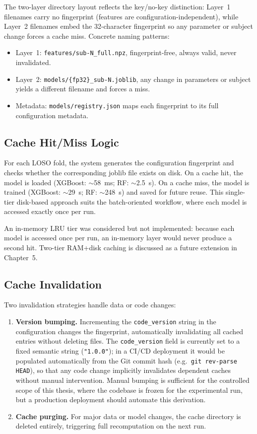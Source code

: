 The two-layer directory layout reflects the key/no-key distinction:
Layer~1 filenames carry no fingerprint (features are
configuration-independent), while Layer~2 filenames embed the
32-character fingerprint so any parameter or subject change forces a
cache miss. Concrete naming patterns:
\begin{itemize}
\item Layer~1: \texttt{features/sub-N\_full.npz}, fingerprint-free,
 always valid, never invalidated.
\item Layer~2: \texttt{models/\{fp32\}\_sub-N.joblib}, any change in
 parameters or subject yields a different filename and forces a
 miss.
\item Metadata: \texttt{models/registry.json} maps each fingerprint to
 its full configuration metadata.
\end{itemize}

\subsection{Cache Hit/Miss Logic}

For each LOSO fold, the system generates the configuration fingerprint and
checks whether the corresponding joblib file exists on disk. On a cache hit,
the model is loaded (XGBoost: $\sim$58~ms; RF: $\sim$2.5~s). On a cache miss,
the model is trained (XGBoost: $\sim$29~s; RF: $\sim$248~s) and saved for
future reuse. This single-tier disk-based approach suits the batch-oriented
workflow, where each model is accessed exactly once per run.

An in-memory LRU tier was considered but not implemented: because each model
is accessed once per run, an in-memory layer would never produce a second hit.
Two-tier RAM+disk caching is discussed as a future extension in Chapter~5.

\subsection{Cache Invalidation}

Two invalidation strategies handle data or code changes:

\begin{enumerate}
\item \textbf{Version bumping.} Incrementing the \texttt{code\_version} string
in the configuration changes the fingerprint, automatically invalidating all
cached entries without deleting files. The \texttt{code\_version} field is
currently set to a fixed semantic string (\texttt{"1.0.0"}); in a CI/CD
deployment it would be populated automatically from the Git commit hash
(e.g.\ \texttt{git rev-parse HEAD}), so that any code change implicitly
invalidates dependent caches without manual intervention. Manual bumping is
sufficient for the controlled scope of this thesis, where the codebase is
frozen for the experimental run, but a production deployment should automate
this derivation.

\item \textbf{Cache purging.} For major data or model changes, the cache
directory is deleted entirely, triggering full recomputation on the next run.
\end{enumerate}

